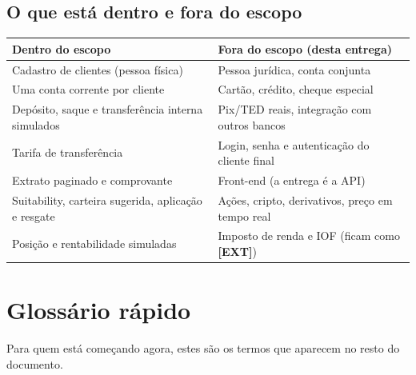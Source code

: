 \documentclass[11pt,a4paper]{article}
\newcommand{\ext}{\textbf{[EXT]}}          %
\begin{document}
\subsection{O que está dentro e fora do escopo}

\begin{tabularx}{\linewidth}{@{}>{\raggedright\arraybackslash}X>{\raggedright\arraybackslash}X@{}}
\toprule
\textbf{Dentro do escopo} & \textbf{Fora do escopo (desta entrega)} \\
\midrule
Cadastro de clientes (pessoa física) & Pessoa jurídica, conta conjunta \\
Uma conta corrente por cliente & Cartão, crédito, cheque especial \\
Depósito, saque e transferência interna simulados & Pix/TED reais, integração com outros bancos \\
Tarifa de transferência & Login, senha e autenticação do cliente final \\
Extrato paginado e comprovante & Front-end (a entrega é a API) \\
Suitability, carteira sugerida, aplicação e resgate & Ações, cripto, derivativos, preço em tempo real \\
Posição e rentabilidade simuladas & Imposto de renda e IOF (ficam como \ext) \\
\bottomrule
\end{tabularx}

\section{Glossário rápido}

Para quem está começando agora, estes são os termos que aparecem no resto do documento.
\end{document}
